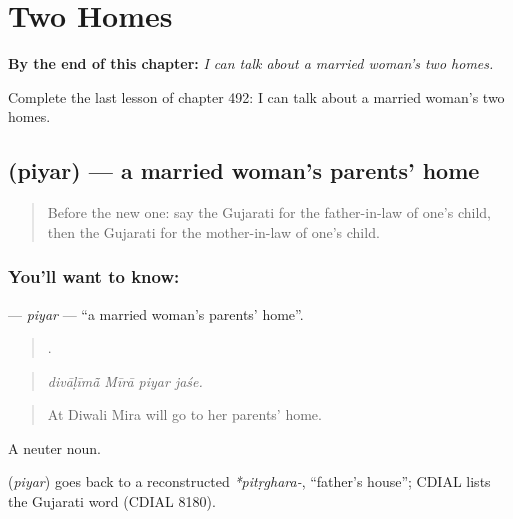 
\chapter{Two Homes}
\label{ch:gu-two-homes}

\begin{chapteropening}
\textbf{By the end of this chapter:} \emph{I can talk about a married woman's two homes.}

Complete the last lesson of chapter 492: I can talk about a married woman's two homes.
\end{chapteropening}

\section[\texorpdfstring{\gu{પિયર} (piyar)}{પિયર (piyar)}]{ (piyar) — a married woman's parents' home}

\label{lesson:GU-C492-piyar}



\begin{quote}
Before the new one: say the Gujarati for the father-in-law of one's child, then the Gujarati for the mother-in-law of one's child.
\end{quote}

\subsection*{You'll want to know: }
\textbf{} — \emph{piyar} — \textquotedblleft{}a married woman's parents' home\textquotedblright{}.

\begin{quote}
   .
\end{quote}

\begin{quote}
\emph{divāḷīmā̃ Mīrā piyar jaśe.}
\end{quote}

\begin{quote}
At Diwali Mira will go to her parents' home.
\end{quote}

A neuter noun.

\begin{cousinweb}
\textbf{} (\emph{piyar}) goes back to a reconstructed \emph{*pitṛghara-}, \textquotedblleft{}father's house\textquotedblright{}; CDIAL lists the Gujarati word (CDIAL 8180).
\end{cousinweb}

